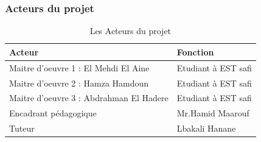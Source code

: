 \documentclass[a4paper]{report}
\begin{document}
\subsubsection{Acteurs du projet}
\begin{table}[!h]
    \centering
    \begin{tabularx}{0.9\textwidth}{
    | >{\centering\arraybackslash}X 
    | >{\centering\arraybackslash}X |}
    \hline
        \textbf{Acteur}&\textbf{Fonction}\\
    \hline
        Maitre d'oeuvre 1 : El Mehdi El Aine & Etudiant à EST safi\\
    \hline    
        Maitre d'oeuvre 2 : Hamza Hamdoun & Etudiant à EST safi\\
    \hline
        Maitre d'oeuvre 3 : Abdrahman El Hadere & Etudiant à EST safi\\
    \hline
        Encadrant pédagogique & Mr.Hamid Maarouf\\
    \hline 
        Tuteur & Lbakali Hanane\\
    \hline    
    \end{tabularx}
    \caption{Les Acteurs du projet}
    \label{tab: Les Acteurs du projet}
\end{table}   
\newpage
\end{document}
